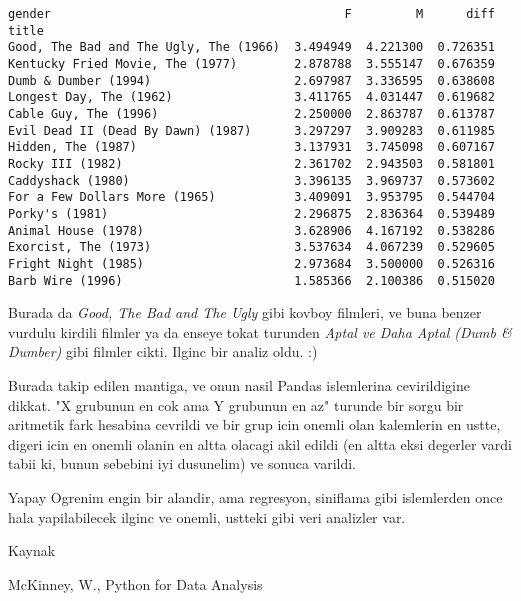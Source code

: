\documentclass[12pt,fleqn]{article}\usepackage{../common}
\begin{document}
\begin{verbatim}
gender                                         F         M      diff
title                                                               
Good, The Bad and The Ugly, The (1966)  3.494949  4.221300  0.726351
Kentucky Fried Movie, The (1977)        2.878788  3.555147  0.676359
Dumb & Dumber (1994)                    2.697987  3.336595  0.638608
Longest Day, The (1962)                 3.411765  4.031447  0.619682
Cable Guy, The (1996)                   2.250000  2.863787  0.613787
Evil Dead II (Dead By Dawn) (1987)      3.297297  3.909283  0.611985
Hidden, The (1987)                      3.137931  3.745098  0.607167
Rocky III (1982)                        2.361702  2.943503  0.581801
Caddyshack (1980)                       3.396135  3.969737  0.573602
For a Few Dollars More (1965)           3.409091  3.953795  0.544704
Porky's (1981)                          2.296875  2.836364  0.539489
Animal House (1978)                     3.628906  4.167192  0.538286
Exorcist, The (1973)                    3.537634  4.067239  0.529605
Fright Night (1985)                     2.973684  3.500000  0.526316
Barb Wire (1996)                        1.585366  2.100386  0.515020
\end{verbatim}

Burada da {\em Good, The Bad and The Ugly} gibi kovboy filmleri, ve buna
benzer vurdulu kirdili filmler ya da enseye tokat turunden {\em Aptal ve Daha
Aptal (Dumb \& Dumber)} gibi filmler cikti. Ilginc bir analiz oldu. :)

Burada takip edilen mantiga, ve onun nasil Pandas islemlerina
cevirildigine dikkat. "X grubunun en cok ama Y grubunun en az" turunde
bir sorgu bir aritmetik fark hesabina cevrildi ve bir grup icin onemli
olan kalemlerin en ustte, digeri icin en onemli olanin en altta
olacagi akil edildi (en altta eksi degerler vardi tabii ki, bunun
sebebini iyi dusunelim) ve sonuca varildi.

Yapay Ogrenim engin bir alandir, ama regresyon, siniflama gibi
islemlerden once hala yapilabilecek ilginc ve onemli, ustteki gibi
veri analizler var.

Kaynak

McKinney, W., Python for Data Analysis
\end{document}

